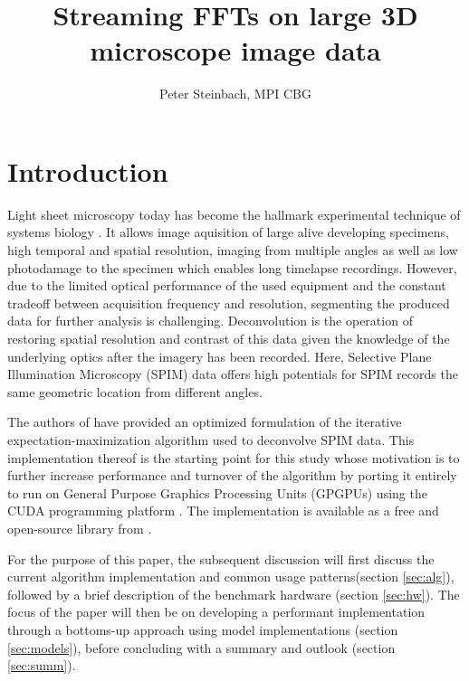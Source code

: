 \documentclass [a4paper,12pt]{article}
\title{Streaming FFTs on large 3D microscope image data}
\author{Peter Steinbach, MPI CBG}
\begin{document}
\maketitle
\begin{abstract}

\end{abstract}

\section{Introduction}

Light sheet microscopy today has become the hallmark experimental technique of systems biology \cite{Huisken13082004, Keller14112008}. It allows image aquisition of large alive developing specimens, high temporal and spatial resolution, imaging from multiple angles as well as low photodamage to the specimen which enables long timelapse recordings. However, due to the limited optical performance of the used equipment and the constant tradeoff between acquisition frequency and resolution, segmenting the produced data for further analysis is challenging. Deconvolution is the operation of restoring spatial resolution and contrast of this data given the knowledge of the underlying optics after the imagery has been recorded. Here, Selective Plane Illumination Microscopy (SPIM) data offers high potentials for SPIM records the same geometric location from different angles.\newline

The authors of \cite{2013arXiv1308.0730P} have provided an optimized formulation of the iterative expectation-maximization algorithm used to deconvolve SPIM data. This implementation thereof \cite{gh_spim_registration} is the starting point for this study whose motivation is to further increase performance and turnover of the algorithm by porting it entirely to run on General Purpose Graphics Processing Units (GPGPUs) using the CUDA programming platform \cite{Nickolls:2008:CUDA}. The implementation is available as a free and open-source library from \cite{lmvn_repo}.\newline

For the purpose of this paper, the subsequent discussion will first discuss the current algorithm implementation and common usage patterns(section \ref{sec:alg}), followed by a brief description of the benchmark hardware (section \ref{sec:hw}). The focus of the paper will then be on developing a performant implementation through a bottoms-up approach using model implementations (section \ref{sec:models}), before concluding with a summary and outlook (section \ref{sec:summ}).\newline
\end{document}
